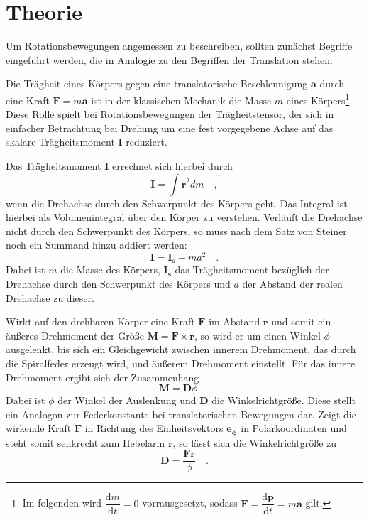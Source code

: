 \section{Theorie}
\label{sec:Theorie}
Um Rotationsbewegungen angemessen zu beschreiben, sollten zunächst Begriffe
eingeführt werden, die in Analogie zu den Begriffen der Translation stehen.

Die Trägheit eines Körpers gegen eine translatorische Beschleunigung $\symbf{a}$
durch eine Kraft $\symbf{F}=m\symbf{a}$ ist in der klassischen Mechanik die
Masse $m$ eines Körpers\footnote{Im folgenden wird
$\dfrac{\mathrm{d}m}{\mathrm{d}t}=0$ vorrausgesetzt, sodass
$\symbf{F}=\dfrac{\mathrm{d}\symbf{p}}{\mathrm{d}t}=m\symbf{a}$ gilt.}.
Diese Rolle spielt bei Rotationsbewegungen der Trägheitstensor, der sich in
einfacher Betrachtung bei Drehung um eine fest vorgegebene Achse auf das skalare
Trägheitsmoment $\symbf{I}$ reduziert.

Das Trägheitsmoment $\symbf{I}$ errechnet sich hierbei durch
\begin{equation}
  \symbf{I}=\int \symbf{r}^2 dm\quad,
  \label{eqn:traegheitallg}
\end{equation}
wenn die Drehachse durch den Schwerpunkt des Körpers geht. Das Integral ist hierbei
als Volumenintegral über den Körper zu verstehen. Verläuft die Drehachse nicht
durch den Schwerpunkt des Körpers, so muss nach dem Satz von Steiner noch ein
Summand hinzu addiert werden:
\begin{equation}
  \symbf{I}=\symbf{I_s}+ma^2\quad.
  \label{eqn:steiner}
\end{equation}
Dabei ist $m$ die Masse des Körpers, $\symbf{I_s}$ das Trägheitsmoment bezüglich
der Drehachse durch den Schwerpunkt des Körpers und $a$ der Abstand der realen
Drehachse zu dieser.

Wirkt auf den drehbaren Körper eine Kraft $\symbf{F}$ im Abstand $\symbf{r}$ und somit ein
äußeres Drehmoment der Größe $\symbf{M}=\symbf{F}\times\symbf{r}$, so wird er um
einen Winkel $\phi$ ausgelenkt, bis sich ein Gleichgewicht zwischen innerem Drehmoment,
das durch die Spiralfeder erzeugt wird, und äußerem Drehmoment einstellt. Für das innere
Drehmoment ergibt sich der Zusammenhang
\begin{equation}
  \symbf{M}=\symbf{D}\phi\quad.
  \label{eqn:drehmoment_innen}
\end{equation}
Dabei ist $\phi$ der Winkel der Auslenkung und $\symbf{D}$ die Winkelrichtgröße.
Diese stellt ein Analogon zur Federkonstante bei translatorischen Bewegungen dar.\cite{wiki:winkelrichtgröße}
Zeigt die wirkende Kraft $\symbf{F}$ in Richtung des Einheitsvektors $\symbf{e_{\phi}}$
in Polarkoordinaten und steht somit senkrecht zum Hebelarm $\symbf{r}$, so lässt sich
die Winkelrichtgröße zu
\begin{equation}
  \symbf{D}=\frac{\symbf{F}\symbf{r}}{\phi}\quad.
  \label{eqn:winkelrg}
\end{equation}

